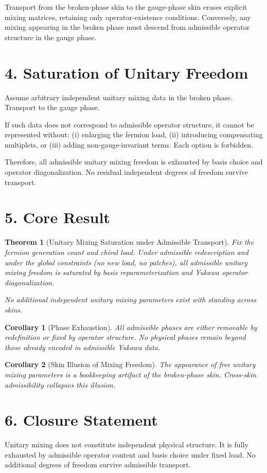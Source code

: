 ﻿\documentclass[11pt]{article}
\newtheorem{theorem}{Theorem}
\newtheorem{corollary}{Corollary}
\begin{document}
Transport from the broken-phase skin to the gauge-phase skin
erases explicit mixing matrices,
retaining only operator-existence conditions.
Conversely, any mixing appearing in the broken phase
must descend from admissible operator structure in the gauge phase.

\section*{4. Saturation of Unitary Freedom}
Assume arbitrary independent unitary mixing data in the broken phase.
Transport to the gauge phase.

If such data does not correspond to admissible operator structure,
it cannot be represented without:
(i) enlarging the fermion load,
(ii) introducing compensating multiplets, or
(iii) adding non-gauge-invariant terms.
Each option is forbidden.

Therefore, all admissible unitary mixing freedom
is exhausted by basis choice and operator diagonalization.
No residual independent degrees of freedom survive transport.

\section*{5. Core Result}
\begin{theorem}[Unitary Mixing Saturation under Admissible Transport]
Fix the fermion generation count and chiral load.
Under admissible redescription and under the global constraints
(no new load, no patches),
all admissible unitary mixing freedom is saturated by
basis reparameterization and Yukawa operator diagonalization.

No additional independent unitary mixing parameters exist
with standing across skins.
\end{theorem}

\begin{corollary}[Phase Exhaustion]
All admissible phases are either removable by redefinition
or fixed by operator structure.
No physical phases remain beyond those already encoded
in admissible Yukawa data.
\end{corollary}

\begin{corollary}[Skin Illusion of Mixing Freedom]
The appearance of free unitary mixing parameters
is a bookkeeping artifact of the broken-phase skin.
Cross-skin admissibility collapses this illusion.
\end{corollary}

\section*{6. Closure Statement}
Unitary mixing does not constitute independent physical structure.
It is fully exhausted by admissible operator content
and basis choice under fixed load.
No additional degrees of freedom survive admissible transport.
\end{document}
